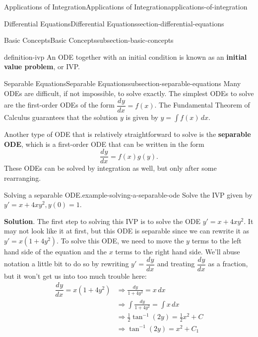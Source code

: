 \documentclass[oneside,10pt,]{book}
\newcommand{\terminology}[1]{\textbf{#1}}
\numberwithin{equation}{section}
\newcommand{\dv}[3][]{\dfrac{d^{#1} #2}{d #3^{#1}}}
\begin{document}
\begin{chapterptx}{Applications of Integration}{}{Applications of Integration}{}{}{applications-of-integration}
\begin{sectionptx}{Differential Equations}{}{Differential Equations}{}{}{section-differential-equations}
\begin{subsectionptx}{Basic Concepts}{}{Basic Concepts}{}{}{subsection-basic-concepts}
\begin{definition}{}{definition-ivp}%
\hypertarget{p-728}{}%
An ODE together with an initial condition is known as an \terminology{initial value problem}, or IVP.%
\end{definition}
\end{subsectionptx}
%
%
\typeout{************************************************}
\typeout{************************************************}
%
\begin{subsectionptx}{Separable Equations}{}{Separable Equations}{}{}{subsection-separable-equations}
\hypertarget{p-729}{}%
Many ODEs are difficult, if not impossible, to solve exactly. The simplest ODEs to solve are the first-order ODEs of the form \(\dv{y}{x} = f(x)\). The Fundamental Theorem of Calculus guarantees that the solution \(y\) is given by \(y = \int f(x)\,dx\).%
\par
\hypertarget{p-730}{}%
Another type of ODE that is relatively straightforward to solve is the \terminology{separable ODE}, which is a first-order ODE that can be written in the form%
%
\begin{equation*}
\dv{y}{x} = f(x)g(y).
\end{equation*}
\hypertarget{p-731}{}%
These ODEs can be solved by integration as well, but only after some rearranging.%
\begin{example}{Solving a separable ODE.}{example-solving-a-separable-ode}%
\hypertarget{p-732}{}%
Solve the IVP given by \(y' = x+4xy^{2}, y(0)=1\).%
\par\smallskip%
\noindent\textbf{Solution}.\hypertarget{solution-154}{}\quad%
\hypertarget{p-733}{}%
The first step to solving this IVP is to solve the ODE \(y' = x+4xy^{2}\). It may not look like it at first, but this ODE is separable since we can rewrite it as \(y' = x(1+4y^{2})\). To solve this ODE, we need to move the \(y\) terms to the left hand side of the equation and the \(x\) terms to the right hand side. We'll abuse notation a little bit to do so by rewriting \(y' = \dv{y}{x}\) and treating \(\dv{y}{x}\) as a fraction, but it won't get us into too much trouble here:%
%
\begin{align*}
\dv{y}{x} = x(1+4y^{2}) &\Rightarrow \frac{dy}{1+4y^{2}} = x\,dx \\
&\Rightarrow \int\frac{dy}{1+4y^{2}}  = \int x\,dx \\
&\Rightarrow \frac{1}{2}\tan^{-1}(2y)  = \frac{1}{2}x^{2}+C \\
&\Rightarrow \tan^{-1}(2y)  = x^{2}+C_{1} 

\end{align*}
\end{example}
\end{subsectionptx}
\end{sectionptx}
\end{chapterptx}
\end{document}
